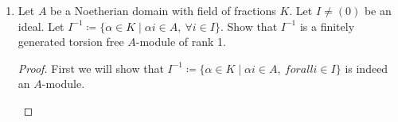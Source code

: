 \documentclass[hidelinks,12pt]{article}
\newcommand{\rk}{\operatorname{rank}}
\begin{document}
\begin{enumerate}
\[        \rk(M)=\sum_{i=1}^s\rk(M_i/M_{i-1})
    \]
    \begin{proof}
        This chain of \(A\)-submodules gives natural injections \(\imath_{n}:M_n\to M_{n+1}\). Each injection defines a short exact sequence:
        \[
            \begin{tikzcd}
                0\arrow[r] & M_{n}\arrow[r, "\imath"] & M_{n+1}\arrow[r] & M_{n+1}/M_n\arrow[r]& 0
            \end{tikzcd}
        \]
        Tensoring each sequence with the field of fractions of \(A\). Gives exact sequences
        \[
            \begin{tikzcd}
                0\arrow[r] & \mathcal{M}_{n}\arrow[r, "\imath"] & \mathcal{M}_{n+1}\arrow[r] & \mathcal{M}_{n+1}/\mathcal{M}_n\arrow[r]& 0
            \end{tikzcd}
        \]
        Then since this is an exact sequence of vector spaces, it splits and so for each \(n\), \(\mathcal{M}_{n+1}\cong\mathcal{M}_{n}\oplus\mathcal{M}_{n+1}/\mathcal{M}_{n}\). In particular,
        \begin{align*}
            \mathcal{M}_{s}&\cong\left[\mathcal{M}_{s-1}\oplus\mathcal{M}_{s}/\mathcal{M}_{s-1}\right]\\
                           &\cong\left[\left(\mathcal{M}_{s-2}\oplus\mathcal{M}_{s-1}/\mathcal{M}_{s-2}\right)\oplus\mathcal{M}_{s}/\mathcal{M}_{s-1}\right]\\
                           &\cong\left[\left(\mathcal{M}_{s-3}\oplus\mathcal{M}_{s-2}/\mathcal{M}_{s-3}\right)\oplus\left(\mathcal{M}_{s-1}/\mathcal{M}_{s-2}\right)\oplus\mathcal{M}_{s}/\mathcal{M}_{s-1}\right]\\
                           &\vdots\\
                           &\cong\bigoplus_{i=1}^{s}(\mathcal{M}_{i}/\mathcal{M}_{i-1})
        \end{align*}
        Each term has \(\dim_K(\mathcal{M}_i/\mathcal{M}_{i-1})=\rk_A(M_i/M_{i-1})\) so \[\rk_A(M)=\sum_{i=1}^s\rk_A(M_i/M_{i-1})\]
    \end{proof} 
\item Let \(A\) be a Noetherian domain with field of fractions \(K\). Let \(I\neq(0)\) be an ideal. Let \(I^{-1}\coloneqq\{\alpha\in K\mid \alpha i\in A,\ \forall i\in I\}\). Show that \(I^{-1}\) is a finitely generated torsion free \(A\)-module of rank 1.
    \begin{proof}
        First we will show that \(I^{-1}\coloneqq\{\alpha\in K\mid \alpha i\in A,\ forall i\in I\}\) is indeed an \(A\)-module. \begin{itemize}

\end{itemize}
\end{proof}
\end{enumerate}
\end{document}
